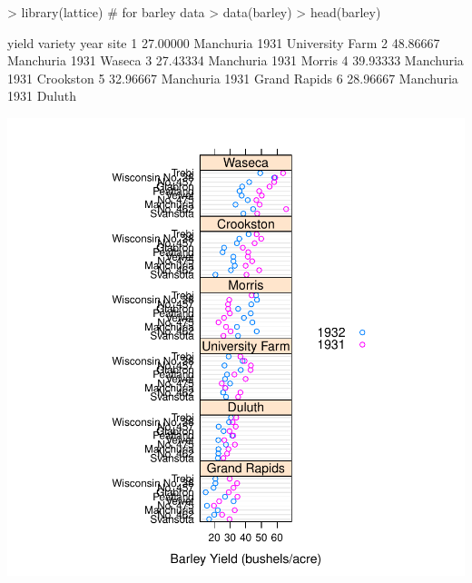 \documentclass[12pt,letterpaper,final]{article}
\begin{document}
\begin{Schunk}
\begin{Sinput}
> library(lattice)  # for barley data
> data(barley)
> head(barley)
\end{Sinput}
\begin{Soutput}
     yield   variety year            site
1 27.00000 Manchuria 1931 University Farm
2 48.86667 Manchuria 1931          Waseca
3 27.43334 Manchuria 1931          Morris
4 39.93333 Manchuria 1931       Crookston
5 32.96667 Manchuria 1931    Grand Rapids
6 28.96667 Manchuria 1931          Duluth
\end{Soutput}
\end{Schunk}
\includegraphics{lect_main-025}
\end{document}
